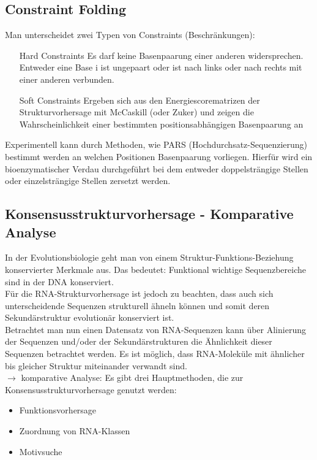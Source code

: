 \subsection{Constraint Folding}
Man unterscheidet zwei Typen von Constraints (Beschränkungen):
\begin{itemize}
\item[Hard Constraints] Es darf keine Basenpaarung einer anderen widersprechen. Entweder eine Base i ist ungepaart oder ist nach links oder nach rechts mit einer anderen verbunden. 
\item[Soft Constraints] Ergeben sich aus den Energiescorematrizen der Strukturvorhersage mit McCaskill (oder Zuker) und zeigen die Wahrscheinlichkeit einer bestimmten positionsabhängigen Basenpaarung an
\end{itemize}

Experimentell kann durch Methoden, wie PARS (Hochdurchsatz-Sequenzierung) bestimmt werden an welchen Positionen Basenpaarung vorliegen. Hierfür wird ein bioenzymatischer Verdau durchgeführt bei dem entweder doppelsträngige Stellen oder einzelsträngige Stellen zersetzt werden.

\subsection{Konsensusstrukturvorhersage - Komparative Analyse}

In der Evolutionsbiologie geht man von einem Struktur-Funktions-Beziehung konservierter Merkmale aus. Das bedeutet: Funktional wichtige Sequenzbereiche sind in der DNA konserviert. \\
Für die RNA-Strukturvorhersage ist jedoch zu beachten, dass auch sich unterscheidende Sequenzen strukturell ähneln können und somit deren Sekundärstruktur evolutionär konserviert ist. \\
Betrachtet man nun einen Datensatz von RNA-Sequenzen kann über Alinierung der Sequenzen und/oder der Sekundärstrukturen die Ähnlichkeit dieser Sequenzen betrachtet werden. Es ist möglich, dass RNA-Moleküle mit ähnlicher bis gleicher Struktur miteinander verwandt sind. \\
$\rightarrow$ komparative Analyse:
Es gibt drei Hauptmethoden, die zur Konsensusstrukturvorhersage genutzt werden: 
\begin{itemize}
\item Funktionsvorhersage \\
\item Zuordnung von RNA-Klassen \\
\item Motivsuche
\end{itemize}

